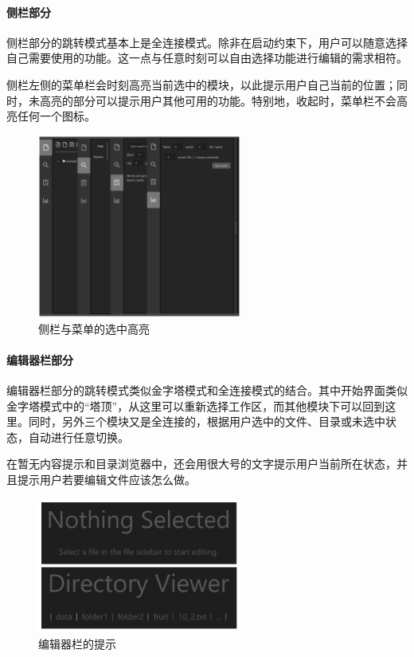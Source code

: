 \documentclass[scheme = chinese]{ctexart}
\begin{document}
\paragraph{侧栏部分}
侧栏部分的跳转模式基本上是全连接模式。除非在启动约束下，用户可以随意选择自己需要使用的功能。这一点与任意时刻可以自由选择功能进行编辑的需求相符。

侧栏左侧的菜单栏会时刻高亮当前选中的模块，以此提示用户自己当前的位置；同时，未高亮的部分可以提示用户其他可用的功能。特别地，收起时，菜单栏不会高亮任何一个图标。

\begin{figure}[h]
    \centering
    \includegraphics[width=0.6\textwidth]{images/dsacd-screenshot-sidebars.drawio.png}
    \caption{侧栏与菜单的选中高亮}
\end{figure}

\paragraph{编辑器栏部分}
编辑器栏部分的跳转模式类似金字塔模式和全连接模式的结合。其中开始界面类似金字塔模式中的“塔顶”，从这里可以重新选择工作区，而其他模块下可以回到这里。同时，另外三个模块又是全连接的，根据用户选中的文件、目录或未选中状态，自动进行任意切换。

在暂无内容提示和目录浏览器中，还会用很大号的文字提示用户当前所在状态，并且提示用户若要编辑文件应该怎么做。

\begin{figure}[h]
    \centering
    \includegraphics[width=0.6\textwidth]{images/dsacd-screenshot-editor-bar-hint.drawio.png}
    \caption{编辑器栏的提示}
\end{figure}
\end{document}
